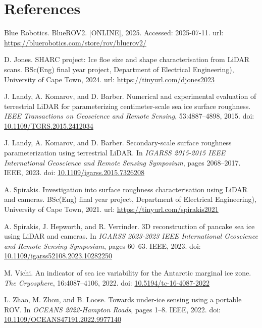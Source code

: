 \section*{References}
\begin{list}{}{\setlength{\leftmargin}{1.5em}\setlength{\itemindent}{-1.5em}\setlength{\itemsep}{0.3em}}
\item Blue Robotics. BlueROV2. [ONLINE], 2025. Accessed: 2025-07-11.
  url: \url{https://bluerobotics.com/store/rov/bluerov2/}
\item D. Jones. SHARC project: Ice floe size and shape characterisation from LiDAR scans. BSc(Eng) final year
  project, Department of Electrical Engineering), University of Cape Town, 2024.
  url: \url{https://tinyurl.com/djones2023}
\item J. Landy, A. Komarov, and D. Barber. Numerical and experimental evaluation of terrestrial LiDAR for
  parameterizing centimeter-scale sea ice surface roughness. \textit{IEEE Transactions on Geoscience and Remote
  Sensing}, 53:4887--4898, 2015. doi: \href{https://doi.org/10.1109/TGRS.2015.2412034}{10.1109/TGRS.2015.2412034}
\item J. Landy, A. Komarov, and D. Barber. Secondary-scale surface roughness parameterization using terrestrial
  LiDAR. In \textit{IGARSS 2015-2015 IEEE International Geoscience and Remote Sensing Symposium}, pages
  2068--2017. IEEE, 2023. doi: \href{https://doi.org/10.1109/igarss.2015.7326208}{10.1109/igarss.2015.7326208}
\item A. Spirakis. Investigation into surface roughness characterisation using LiDAR and cameras. BSc(Eng) final
  year project, Department of Electrical Engineering), University of Cape Town, 2021.
  url: \url{https://tinyurl.com/spirakis2021}
\item A. Spirakis, J. Hepworth, and R. Verrinder. 3D reconstruction of pancake sea ice using LiDAR and cameras. In
  \textit{IGARSS 2023-2023 IEEE International Geoscience and Remote Sensing Symposium}, pages 60--63. IEEE, 2023.
  doi: \href{https://doi.org/10.1109/igarss52108.2023.10282250}{10.1109/igarss52108.2023.10282250}
\item M. Vichi. An indicator of sea ice variability for the Antarctic marginal ice zone. \textit{The Cryosphere},
  16:4087--4106, 2022. doi: \href{https://doi.org/10.5194/tc-16-4087-2022}{10.5194/tc-16-4087-2022}
\item L. Zhao, M. Zhou, and B. Loose. Towards under-ice sensing using a portable ROV. In \textit{OCEANS
  2022-Hampton Roads}, pages 1--8. IEEE, 2022.
  doi: \href{https://doi.org/10.1109/OCEANS47191.2022.9977140}{10.1109/OCEANS47191.2022.9977140}
\end{list}
